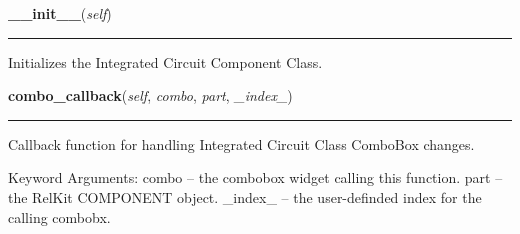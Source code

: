     \label{reliafree:integrated_circuits:ic:IntegratedCircuit:__init__}

    \vspace{0.5ex}

\hspace{.8\funcindent}\begin{boxedminipage}{\funcwidth}

    \raggedright \textbf{\_\_init\_\_}(\textit{self})

    \vspace{-1.5ex}

    \rule{\textwidth}{0.5\fboxrule}
\setlength{\parskip}{2ex}
    Initializes the Integrated Circuit Component Class.

\setlength{\parskip}{1ex}
    \end{boxedminipage}

    \label{reliafree:integrated_circuits:ic:IntegratedCircuit:combo_callback}

    \vspace{0.5ex}

\hspace{.8\funcindent}\begin{boxedminipage}{\funcwidth}

    \raggedright \textbf{combo\_callback}(\textit{self}, \textit{combo}, \textit{part}, \textit{\_index\_})

    \vspace{-1.5ex}

    \rule{\textwidth}{0.5\fboxrule}
\setlength{\parskip}{2ex}
    Callback function for handling Integrated Circuit Class ComboBox 
    changes.

    Keyword Arguments: combo   -- the combobox widget calling this 
    function. part    -- the RelKit COMPONENT object. \_index\_ -- the 
    user-definded index for the calling combobx.

\setlength{\parskip}{1ex}
    \end{boxedminipage}

